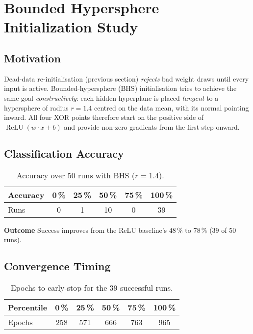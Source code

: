 \section{Bounded Hypersphere Initialization Study}
\label{sec:relu1-bounded-hypersphere}

\subsection*{Motivation}
Dead-data re-initialisation (previous section) \emph{rejects} bad weight
draws until every input is active.  
Bounded-hypersphere (BHS) initialisation tries to achieve the same goal
\emph{constructively}: each hidden hyperplane is placed
\emph{tangent} to a hypersphere of radius $r=1.4$
centred on the data mean, with its normal pointing inward.
All four XOR points therefore start on the positive side of
\(\operatorname{ReLU}(w\!\cdot\!x+b)\) and provide non-zero gradients
from the first step onward.

\subsection*{Classification Accuracy}

\begin{table}[h]
\centering
\caption{Accuracy over 50 runs with BHS ($r=1.4$).}
\label{tab:relu1-bhs-accuracy}
\begin{tabular}{lccccc}
\toprule
Accuracy & 0\,\% & 25\,\% & 50\,\% & 75\,\% & 100\,\% \\
\midrule
Runs & 0 & 1 & 10 & 0 & 39 \\
\bottomrule
\end{tabular}
\end{table}

\textbf{Outcome}
Success improves from the ReLU baseline's $48\,\%$ to $78\,\%$ (39 of 50 runs).

\subsection*{Convergence Timing}

\begin{table}[h]
\centering
\caption{Epochs to early-stop for the 39 successful runs.}
\label{tab:relu1-bhs-epochs}
\begin{tabular}{lccccc}
\toprule
Percentile & 0\,\% & 25\,\% & 50\,\% & 75\,\% & 100\,\% \\
\midrule
Epochs & 258 & 571 & 666 & 763 & 965\\
\bottomrule
\end{tabular}
\end{table}


